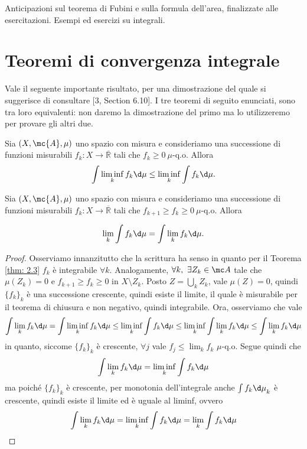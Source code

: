 Anticipazioni sul teorema di Fubini e sulla formula dell'area, finalizzate alle esercitazioni. Esempi ed esercizi su integrali.

\section{Teoremi di convergenza integrale}
Vale il seguente importante risultato, per una dimostrazione del quale si suggerisce di consultare [3, Section 6.10]. I tre teoremi di seguito enunciati, sono tra loro equivalenti: non daremo la dimostrazione del primo ma lo utilizzeremo per provare gli altri due.
\begin{shadedTheorem}Sia $(X, \mc{A}, \mu)$ uno spazio con misura e consideriamo una successione di funzioni misurabili $f_{k}: X \rightarrow \overline{\mathbb{R}}$ tali che $f_{k} \geq 0 \ \mu$-q.o. Allora
\[ \int \liminf_{k} f_{k} \d \mu \leq \liminf_{k} \int f_{k} \d \mu.\]
\end{shadedTheorem}
\begin{shadedTheorem}\label{thm: 2.6} Sia $(X, \mc{A}, \mu)$ uno spazio con misura e consideriamo una successione di funzioni misurabili $f_{k}: X \rightarrow \overline{\mathbb{R}}$ tali che $f_{k+1} \geq f_{k} \geq 0 \ \mu$-q.o. Allora

\[\lim _{k} \int f_{k} \d \mu=\int \lim _{k} f_{k} \d \mu .\]
\end{shadedTheorem}
\begin{proof}
    Osserviamo innanzitutto che la scrittura ha senso in quanto per il Teorema \ref{thm: 2.3} $f_k$ è integrabile $\forall k$. Analogamente, $\forall k,\ \exists Z_k\in \mc A$ tale che $\mu(Z_k)=0$ e $f_{k+1}\geq f_k\geq 0$ in $X\setminus Z_k$. Posto $Z=\bigcup_kZ_k$, vale $\mu(Z)=0$, quindi $\{f_k\}_k$ è una successione crescente, quindi esiste il limite, il quale è misurabile per il teorema di chiusura e non negativo, quindi integrabile. Ora, osserviamo che vale 
    \[\int\lim_kf_k\d\mu = \int \liminf_kf_k\d\mu\leq \liminf_k\int f_k\d\mu \leq \liminf_k\int \lim_kf_k\d\mu\leq \int \lim_k f_k\d \mu\]
    in quanto, siccome $\{f_k\}_k$ è crescente, $\forall j$ vale $f_j\leq \lim_kf_k$ $\mu$-q.o. Segue quindi che 
    \[\int \lim_kf_k\d\mu = \liminf _k\int f_k\d\mu\]
    ma poiché $\{f_k\}_k$ è crescente, per monotonia dell'integrale anche ${\int f_k\d\mu}_k$ è crescente, quindi esiste il limite ed è uguale al liminf, ovvero
    \[\int \lim_kf_k\d\mu = \liminf _k\int f_k\d\mu = \lim _k\int f_k\d\mu\qedhere\]
\end{proof}
